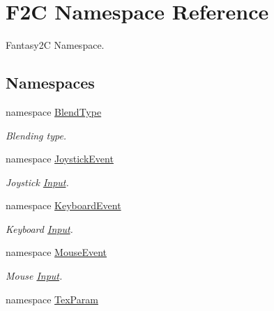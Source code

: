 \hypertarget{namespace_f2_c}{
\section{F2C Namespace Reference}
\label{namespace_f2_c}
}


Fantasy2C Namespace.  
\subsection*{Namespaces}
\begin{DoxyCompactItemize}
\item 
namespace \hyperlink{namespace_f2_c_1_1_blend_type}{BlendType}


\begin{DoxyCompactList}\small\item\em Blending type. \item\end{DoxyCompactList}\item 
namespace \hyperlink{namespace_f2_c_1_1_joystick_event}{JoystickEvent}


\begin{DoxyCompactList}\small\item\em Joystick \hyperlink{class_f2_c_1_1_input}{Input}. \item\end{DoxyCompactList}\item 
namespace \hyperlink{namespace_f2_c_1_1_keyboard_event}{KeyboardEvent}


\begin{DoxyCompactList}\small\item\em Keyboard \hyperlink{class_f2_c_1_1_input}{Input}. \item\end{DoxyCompactList}\item 
namespace \hyperlink{namespace_f2_c_1_1_mouse_event}{MouseEvent}


\begin{DoxyCompactList}\small\item\em Mouse \hyperlink{class_f2_c_1_1_input}{Input}. \item\end{DoxyCompactList}\item 
namespace \hyperlink{namespace_f2_c_1_1_tex_param}{TexParam}



\end{DoxyCompactItemize}
